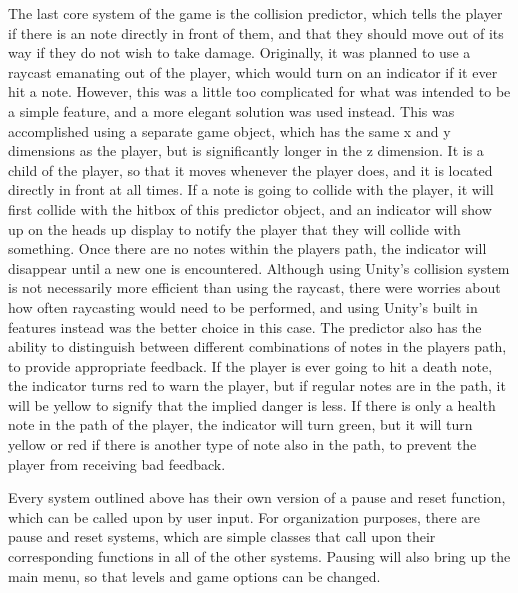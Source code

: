 \documentclass[10pt,twocolumn]{article}
\begin{document}
The last core system of the game is the collision predictor, which tells the player if there is an note directly in front of them, and that they should move out of its way if they do not wish to take damage. Originally, it was planned to use a raycast emanating out of the player, which would turn on an indicator if it ever hit a note. However, this was a little too complicated for what was intended to be a simple feature, and a more elegant solution was used instead. This was accomplished using a separate game object, which has the same x and y dimensions as the player, but is significantly longer in the z dimension. It is a child of the player, so that it moves whenever the player does, and it is located directly in front at all times. If a note is going to collide with the player, it will first collide with the hitbox of this predictor object, and an indicator will show up on the heads up display to notify the player that they will collide with something. Once there are no notes within the players path, the indicator will disappear until a new one is encountered. Although using Unity's collision system is not necessarily more efficient than using the raycast, there were worries about how often raycasting would need to be performed, and using Unity's built in features instead was the better choice in this case. The predictor also has the ability to distinguish between different combinations of notes in the players path, to provide appropriate feedback. If the player is ever going to hit a death note, the indicator turns red to warn the player, but if regular notes are in the path, it will be yellow to signify that the implied danger is less. If there is only a health note in the path of the player, the indicator will turn green, but it will turn yellow or red if there is another type of note also in the path, to prevent the player from receiving bad feedback.

Every system outlined above has their own version of a pause and reset function, which can be called upon by user input. For organization purposes, there are pause and reset systems, which are simple classes that call upon their corresponding functions in all of the other systems. Pausing will also bring up the main menu, so that levels and game options can be changed.
\end{document}
